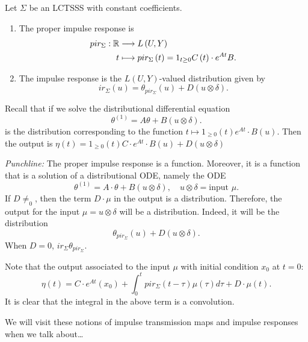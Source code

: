 \begin{definition}
	Let $\Sigma$ be an LCTSSS with constant coefficients. 
	\begin{enumerate}
		\item The proper impulse response is 
\begin{align*}
				pir_\Sigma:\mathbb{R}  &\longrightarrow L\left( U, Y \right)  \\
				t  &\longmapsto pir_\Sigma\left( t \right)  = 1_{  t  \ge 0}C\left( t \right) \cdot e ^{At}  B 
			.\end{align*}
		\item The impulse response is the $L\left( U, Y \right) $-valued distribution given by 
			\[
				ir_{\Sigma }\left( u \right) = \theta_{pir_{\Sigma}}\left( u \right)  + D\left( u \otimes \delta \right) 
			.\] 
	\end{enumerate}
	\begin{note}
		Recall that if we solve the distributional differential equation 
		\[
			\theta ^{\left( 1 \right) } = A\theta + B\left( u \otimes \delta \right) 
		.\] 
		is the distribution corresponding to the function $t \longmapsto 1 _{\ge  0}\left( t \right) e^{At}\cdot B\left( u \right) $. Then the output is $\eta\left( t \right) = 1 _{\ge  0}\left( t \right) C\cdot e^{At}\cdot B\left( u \right)  + D\left( u \otimes \delta  \right) $
	\end{note}
	\emph{Punchline: }The proper impulse response is a function. Moreover, it is a function that is a solution of a distributional ODE, namely the ODE 
	\[
		\theta^{\left( 1 \right) } = A\cdot \theta + B\left( u \otimes \delta \right) , \quad u \otimes \delta = \text{input } \mu
	.\] 
	If $D \neq_0$, then the term $D\cdot \mu$ in the output is a distribution. Therefore, the output for the input $\mu= u \otimes \delta $ will be a distribution. Indeed, it will be the distribution 
	\[
		\theta _{pir_{\Sigma}}\left( u \right) + D\left( u \otimes \delta \right) 
	.\] 
	When $D = 0$, $ir_{\Sigma} \theta _{pir_{\Sigma}}$.
\end{definition}

Note that the output associated to the input $\mu$ with initial condition $x_0$ at $t=0 $:
\[
	\eta\left( t \right) = C\cdot e^{At}\left( x_0 \right) + \int_{0 }^{t} pir_\Sigma \left( t - \tau \right) \mu\left( \tau \right) d \tau + D\cdot \mu\left( t \right) 
.\] 
It is clear that the integral in the above term is a convolution. 

We will visit these notions of impulse transmission maps and impulse responses when we talk about\ldots

